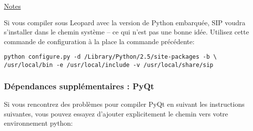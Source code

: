 \underline{Notes}

Si vous compiler sous Leopard avec la version de Python embarqu\'ee, SIP voudra s'installer dans le chemin syst\`eme -- ce qui n'est pas une bonne id\'ee. Utilisez cette commande de configuration \`a la place la commande pr\'ec\'edente:

\begin{verbatim}
python configure.py -d /Library/Python/2.5/site-packages -b \
/usr/local/bin -e /usr/local/include -v /usr/local/share/sip
\end{verbatim}

% 
% 
% 
% 
% 
% 
% 
% 
% 

\subsubsection{D\'ependances suppl\'ementaires : PyQt}
Si vous rencontrez des probl\`emes pour compiler PyQt en suivant les instructions suivantes, vous pouvez essayez d'ajouter explicitement le chemin vers votre environnement python:

